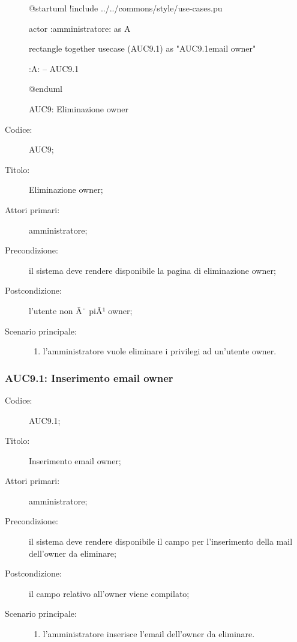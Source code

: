 \documentclass[../../../analisi-dei-requisiti.tex]{subfiles}
\begin{document}
\begin{figure}[H]
  \centering
  \begin{plantuml}
  @startuml
  !include ../../commons/style/use-cases.pu

  actor :amministratore: as A

  rectangle {
    together {
      usecase (AUC9.1) as "AUC9.1\nInserimento email owner"
    }
  }

  :A: -- AUC9.1

  @enduml
  \end{plantuml}
  \caption{AUC9: Eliminazione owner}%
  \label{fig:AUC9}
\end{figure}

\begin{description}
  \item[Codice:] AUC9;
  \item[Titolo:] Eliminazione owner;
  \item[Attori primari:] amministratore;
  \item[Precondizione:] il sistema deve rendere disponibile la pagina di eliminazione owner;
  \item[Postcondizione:] l'utente non Ã¨ piÃ¹ owner;
  \item[Scenario principale:]
  \begin{enumerate}
    \item l'amministratore vuole eliminare i privilegi ad un'utente owner.
  \end{enumerate}
\end{description}

\subsubsection{AUC9.1: Inserimento email owner}%
\label{subs:AUC9.1}
\begin{description}
  \item[Codice:] AUC9.1;
  \item[Titolo:] Inserimento email owner;
  \item[Attori primari:] amministratore;
  \item[Precondizione:] il sistema deve rendere disponibile il campo per l'inserimento della mail dell'owner da eliminare;
  \item[Postcondizione:] il campo relativo all'owner viene compilato;
  \item[Scenario principale:]
  \begin{enumerate}
    \item l'amministratore inserisce l'email dell'owner da eliminare.
  \end{enumerate}
\end{description}
\end{document}
